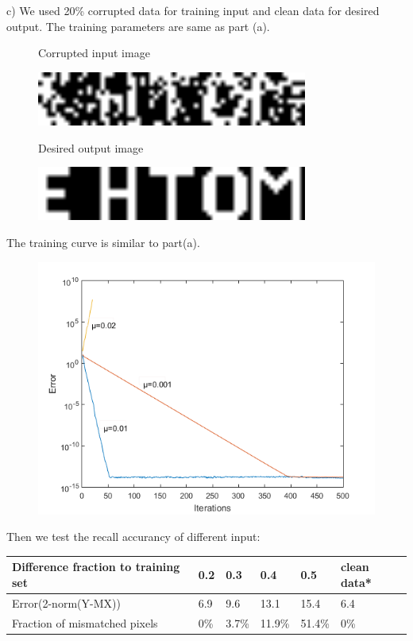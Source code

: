 \documentclass[epsfig]{article}
\def\spar{\vskip10pt}
\begin{document}
c)
\spar
We used 20\% corrupted data for training input and clean data for desired output. The training parameters are same as part (a).
\begin{figure}[H] 
	\centerline{Corrupted input image}
	\centering\includegraphics[width=3.5in]{p20.png} 
	\centerline{Desired output image}
	\centering\includegraphics[width=3.5in]{oricha.png} 

\end{figure} 
The training curve is similar to part(a).
\begin{figure}[H] 
	\centering\includegraphics[width=4.5in]{train.png} 

\end{figure} 
Then we test the recall accurancy of different input:
\begin{center}
	\begin{tabular}{| l | l | l | l | l| l|}
		\hline
		Difference fraction to training set & 0.2 & 0.3 & 0.4 &0.5 & clean data*  \\ \hline
		Error(2-norm(Y-MX)) & 6.9 & 9.6 & 13.1 &15.4& 6.4 \\ \hline
		Fraction of mismatched pixels& 0\% & 3.7\% & 11.9\% &51.4\% & 0\%\\ \hline
		
	\end{tabular}
\end{center}
\end{document}
